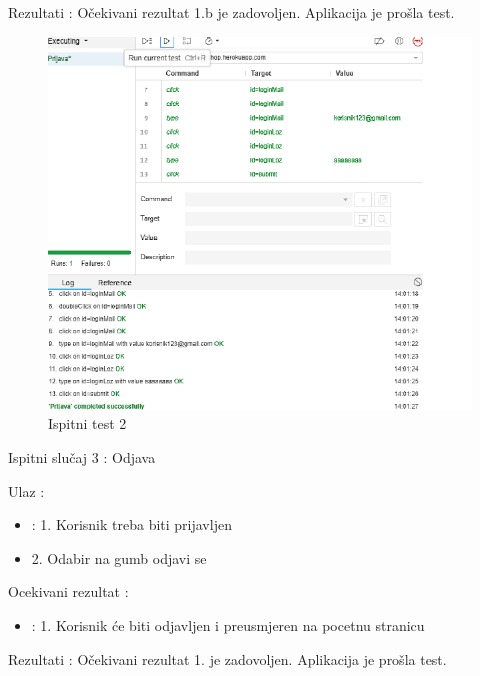 			\noindent Rezultati : Očekivani rezultat 1.b je zadovoljen. Aplikacija je prošla test. 

			\begin{figure}[H]
				\includegraphics[width=1\linewidth]{slike/ispitni_test_2.png} %
				\caption{Ispitni test 2}
				\label{fig:Test2} %
			\end{figure}			

			\noindent Ispitni slučaj 3 : Odjava

			\noindent Ulaz : 
	
			\begin{itemize}
				\item : 1. Korisnik treba biti prijavljen
				\item   2. Odabir na gumb odjavi se
			\end{itemize}

			\noindent Ocekivani rezultat : 

			\begin{itemize}
				\item : 1. Korisnik će biti odjavljen i preusmjeren na pocetnu stranicu
			\end{itemize}
	
			\noindent Rezultati : Očekivani rezultat 1. je zadovoljen. Aplikacija je prošla test. 

